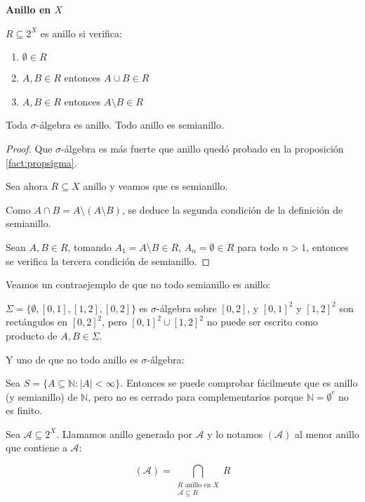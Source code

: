 \begin{definition} \textbf{Anillo en $X$}

 $R\subseteq 2^X$ es anillo si verifica:
 
 \begin{enumerate}[i]
  \item $\emptyset \in R$
  \item $A,B \in R$ entonces $A\cup B \in R$
  \item $A,B \in R$ entonces $A\setminus B \in R$
 \end{enumerate}
\end{definition}


\begin{fact}
 Toda $\sigma$-álgebra es anillo. Todo anillo es semianillo.
\end{fact}

\begin{proof}
 Que $\sigma$-álgebra es más fuerte que anillo quedó probado en la proposición \ref{fact:propsigma}.
 
 Sea ahora $R \subseteq X$ anillo y veamos que es semianillo.

 Como $A\cap B = A\setminus (A\setminus B)$, se deduce la segunda condición de la definición de semianillo.
 
 Sean $A, B \in R$, tomando $A_1 = A\setminus B \in R$, $A_n = \emptyset \in R$ para todo $n > 1$, entonces se 
 verifica la tercera condición de semianillo.
\end{proof}

\begin{counterex}
 Veamos un contraejemplo de que no todo semianillo es anillo:
 
 $\Sigma = \{\emptyset, [0,1], [1,2], [0,2]\}$ es $\sigma$-álgebra sobre $[0,2]$, y $[0,1]^2$ y $[1,2]^2$ son rectángulos
 en $[0,2]^2$, pero $[0,1]^2 \cup [1,2]^2$ no puede ser escrito como producto de $A,B \in \Sigma$.
 
 Y uno de que no todo anillo es $\sigma$-álgebra:
 
 Sea $S = \{A\subseteq \mathbb{N}: |A| < \infty\}$. Entonces se puede comprobar fácilmente que es anillo (y semianillo)
 de $\mathbb{N}$, pero no es cerrado para complementarios porque $\mathbb{N} = \emptyset^c$ no es finito.
\end{counterex}


\begin{definition}
 Sea $\mathcal{A} \subseteq 2^X$. Llamamos anillo generado por $\mathcal{A}$ y lo notamos $(\mathcal{A})$ al
 menor anillo que contiene a $\mathcal{A}$:
 
 \[(\mathcal{A}) = \bigcap_{\begin{array}{c}R \textrm{ anillo en } X\\ \mathcal{A}\subseteq R \end{array}} R\]
\end{definition}

